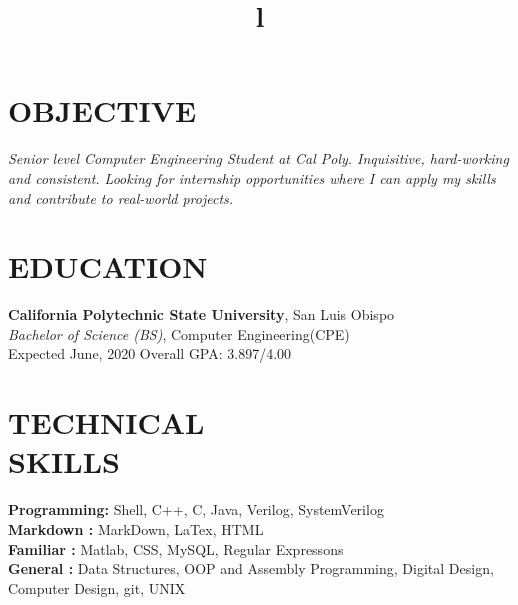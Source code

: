 \documentclass[margin]{res}
\begin{document}
\begin{resume}

\section{OBJECTIVE}
{\sl Senior level Computer Engineering Student at Cal Poly. Inquisitive, hard-working and consistent. Looking for internship opportunities where I can apply my skills and contribute to real-world projects.}

\section{EDUCATION}

\textbf{California Polytechnic State University}, San Luis Obispo\\
{\sl Bachelor of Science (BS)}, Computer Engineering(CPE)\\
Expected June, 2020
\hfill Overall GPA: 3.897/4.00 


\section{TECHNICAL\\SKILLS}

\textbf{Programming:} Shell, C++, C, Java, Verilog, SystemVerilog
\\
\textbf{Markdown :} MarkDown, LaTex, HTML
\\
\textbf{Familiar :} Matlab, CSS, MySQL, Regular Expressons
\\
\textbf{General :} Data Structures, OOP and Assembly Programming, Digital Design, Computer Design, git, UNIX

\begin{format}
\title{l}\\
\\
\body\\
\end{format}





\end{resume}
\end{document}
